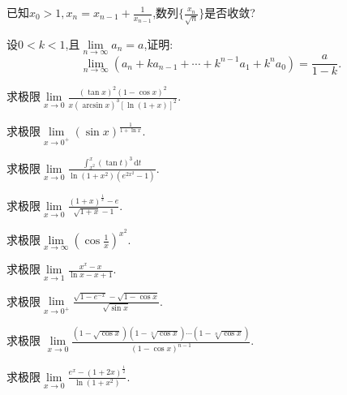 \documentclass[UTF8,a4paper]{ctexart}
\begin{document}
\newpage
\begin{thinking}[上海财经大学,2023]
	已知$x_0>1,x_n=x_{n-1}+\frac{1}{x_{n-1}}$,数列$\{\frac{x_n}{\sqrt{n}}\}$是否收敛?
\end{thinking}
\begin{thinking}
	设$0<k<1$,且$\lim\limits_{n\to\infty}a_n=a$,证明:
	\begin{equation*}
		\lim\limits_{n\to\infty}\left(a_n+ka_{n-1}+\cdots+k^{n-1}a_1+k^na_0\right)=\frac{a}{1-k}.
	\end{equation*}
\end{thinking}
\newpage
\begin{example}[华南师范大学,2023]
	求极限$\lim\limits_{x\to 0}\frac{(\tan x)^2(1-\cos x)^2}{x(\arcsin x)^3\left[\ln (1+x)\right]^2}$.
\end{example}
\begin{example}[新疆大学,2023]
	求极限$\lim\limits_{x\to 0^+}\left(\sin x\right)^{\frac{1}{1+\ln x}}$.
\end{example}
\begin{example}[吉林大学,2023]
	求极限$\lim\limits_{x\to 0}\frac{\int_{x^2}^{x}\left(\tan t\right)^3 \,\mathrm{d} t}{\ln \left(1+x^2\right)\left(e^{2x^2}-1\right)}$.
\end{example}
\begin{example}[太原理工大学,2023]
	求极限$\lim\limits_{x\to 0}\frac{(1+x)^{\frac{1}{x}}-e}{\sqrt{1+x}-1}$.
\end{example}
\newpage
\begin{thinking}[北京科技大学,2023]
	求极限$\lim\limits_{x\to \infty}\left(\cos \frac1x\right)^{x^2}$.
\end{thinking}
\begin{thinking}[中科学技术大学,2023]
	求极限$\lim\limits_{x\to 1}\frac{x^x-x}{\ln x-x+1}$.
\end{thinking}
\begin{thinking}[华东师范大学,2023]
	求极限$\lim\limits_{x\to 0^+}\frac{\sqrt{1-e^{-x}}-\sqrt{1-\cos x}}{\sqrt{\sin x}}$.
\end{thinking}
\begin{thinking}[上海财经大学,2023]
	求极限
	$\lim\limits_{x\to 0}\frac{\left(1-\sqrt{\cos x}\right)\left(1-\sqrt[3]{\cos x}\right)\dotsm\left(1-\sqrt[n]{\cos x}\right)}{{\left(1-\cos x\right)}^{n-1}}$.
\end{thinking}
\newpage
\begin{example}
	求极限$\lim\limits_{x\to 0}\frac{e^x-\left(1+2x\right)^{\frac12}}{\ln \left(1+x^2\right)}$.
\end{example}
\end{document}
